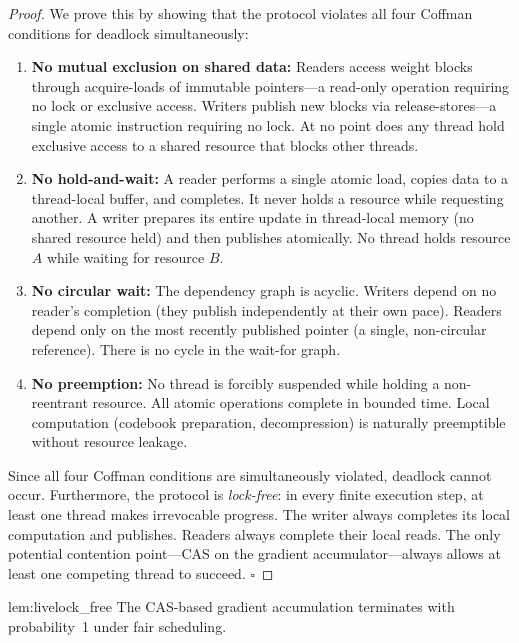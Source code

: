 \begin{proof}
We prove this by showing that the protocol violates all four Coffman conditions for deadlock simultaneously:

\begin{enumerate}
    \item \textbf{No mutual exclusion on shared data:} Readers access weight blocks through acquire-loads of immutable pointers---a read-only operation requiring no lock or exclusive access. Writers publish new blocks via release-stores---a single atomic instruction requiring no lock. At no point does any thread hold exclusive access to a shared resource that blocks other threads.

    \item \textbf{No hold-and-wait:} A reader performs a single atomic load, copies data to a thread-local buffer, and completes. It never holds a resource while requesting another. A writer prepares its entire update in thread-local memory (no shared resource held) and then publishes atomically. No thread holds resource $A$ while waiting for resource $B$.

    \item \textbf{No circular wait:} The dependency graph is acyclic. Writers depend on no reader's completion (they publish independently at their own pace). Readers depend only on the most recently published pointer (a single, non-circular reference). There is no cycle in the wait-for graph.

    \item \textbf{No preemption:} No thread is forcibly suspended while holding a non-reentrant resource. All atomic operations complete in bounded time. Local computation (codebook preparation, decompression) is naturally preemptible without resource leakage.
\end{enumerate}

Since all four Coffman conditions are simultaneously violated, deadlock cannot occur. Furthermore, the protocol is \textit{lock-free}: in every finite execution step, at least one thread makes irrevocable progress. The writer always completes its local computation and publishes. Readers always complete their local reads. The only potential contention point---CAS on the gradient accumulator---always allows at least one competing thread to succeed. $\square$
\end{proof}

\begin{mylemma}{lem:livelock_free}
The CAS-based gradient accumulation terminates with probability~1 under fair scheduling.
\end{mylemma}

